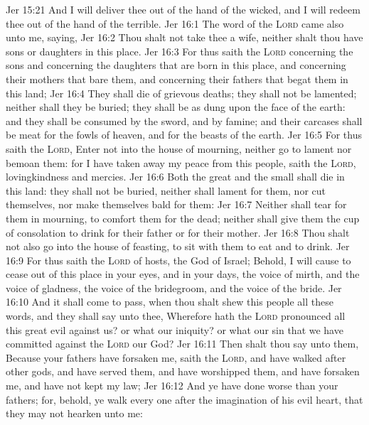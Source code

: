 \vs Jer 15:21 And I will deliver thee out of the hand of the wicked, and I will redeem thee out of the hand of the terrible.
\vs Jer 16:1 The word of the \textsc{Lord} came also unto me, saying,
\vs Jer 16:2 Thou shalt not take thee a wife, neither shalt thou have sons or daughters in this place.
\vs Jer 16:3 For thus saith the \textsc{Lord} concerning the sons and concerning the daughters that are born in this place, and concerning their mothers that bare them, and concerning their fathers that begat them in this land;
\vs Jer 16:4 They shall die of grievous deaths; they shall not be lamented; neither shall they be buried;  they shall be as dung upon the face of the earth: and they shall be consumed by the sword, and by famine; and their carcases shall be meat for the fowls of heaven, and for the beasts of the earth.
\vs Jer 16:5 For thus saith the \textsc{Lord}, Enter not into the house of mourning, neither go to lament nor bemoan them: for I have taken away my peace from this people, saith the \textsc{Lord},  lovingkindness and mercies.
\vs Jer 16:6 Both the great and the small shall die in this land: they shall not be buried, neither shall  lament for them, nor cut themselves, nor make themselves bald for them:
\vs Jer 16:7 Neither shall  tear  for them in mourning, to comfort them for the dead; neither shall  give them the cup of consolation to drink for their father or for their mother.
\vs Jer 16:8 Thou shalt not also go into the house of feasting, to sit with them to eat and to drink.
\vs Jer 16:9 For thus saith the \textsc{Lord} of hosts, the God of Israel; Behold, I will cause to cease out of this place in your eyes, and in your days, the voice of mirth, and the voice of gladness, the voice of the bridegroom, and the voice of the bride.
\vs Jer 16:10 And it shall come to pass, when thou shalt shew this people all these words, and they shall say unto thee, Wherefore hath the \textsc{Lord} pronounced all this great evil against us? or what  our iniquity? or what  our sin that we have committed against the \textsc{Lord} our God?
\vs Jer 16:11 Then shalt thou say unto them, Because your fathers have forsaken me, saith the \textsc{Lord}, and have walked after other gods, and have served them, and have worshipped them, and have forsaken me, and have not kept my law;
\vs Jer 16:12 And ye have done worse than your fathers; for, behold, ye walk every one after the imagination of his evil heart, that they may not hearken unto me:
